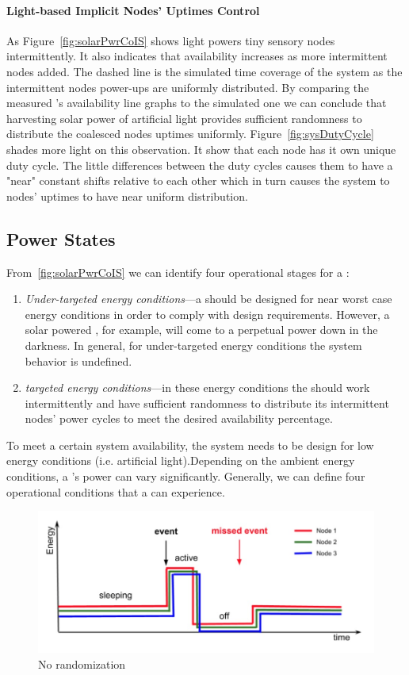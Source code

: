 \paragraph{Light-based Implicit Nodes' Uptimes Control}
%
%
As Figure~\ref{fig:solarPwrCoIS} shows light powers tiny sensory nodes intermittently. It also indicates that \sys availability increases as more intermittent nodes added. The dashed line is the simulated time coverage of the system as the intermittent nodes power-ups are uniformly distributed. By comparing the measured \sys's availability line graphs to the simulated one we can conclude that harvesting solar power of artificial light provides sufficient randomness to distribute the coalesced nodes uptimes uniformly. Figure~\ref{fig:sysDutyCycle} shades more light on this observation. It show that each node has it own unique duty cycle. The little differences between the duty cycles causes them to have a "near" constant shifts relative to each other which in turn causes the system to nodes' uptimes to have near uniform distribution.

\subsection{\fullsys Power States}
From~\ref{fig:solarPwrCoIS} we can identify four operational stages for a \sys:
\begin{enumerate}
		\item \textit{Under-targeted energy conditions}---a \sys should be designed for near worst case energy conditions in order to comply with design requirements. However, a solar powered \sys, for example,  will come to a perpetual power down in the darkness. In general, for under-targeted energy conditions the system behavior is undefined.
		\item \textit{targeted energy conditions}---in these energy conditions the \sys should work intermittently and have sufficient randomness to distribute its intermittent nodes' power cycles to meet the desired availability percentage. 
\end{enumerate}


To meet a certain system availability, the system needs to be design for low energy conditions (i.e. artificial light).Depending on the ambient energy conditions, a \sys's power can vary significantly.  Generally, we can define four operational conditions that a \sys can experience.

\begin{figure}
		\centering
		\includegraphics[width=\columnwidth]{figures/noRandomization}
		\caption{ No randomization}
		\label{fig:noRand}
\end{figure} 

